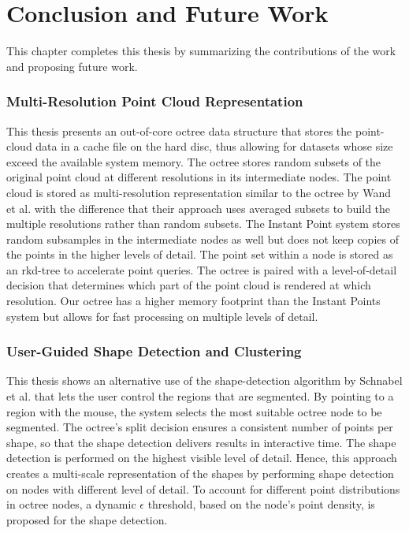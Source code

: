 \chapter{Conclusion and Future Work}
\label{chap:conclusion}


This chapter completes this thesis by summarizing the contributions of the work and proposing future work.

\subsection*{Multi-Resolution Point Cloud Representation}

This thesis presents an out-of-core octree data structure that stores the point-cloud data in a cache file on the hard disc, thus allowing for datasets whose size exceed the available system memory. The octree stores random subsets of the original point cloud at different resolutions in its intermediate nodes. The point cloud is stored as multi-resolution representation similar to the octree by Wand et al. \cite{wand2007interactive} with the difference that their approach uses averaged subsets to build the multiple resolutions rather than random subsets. The Instant Point system \cite{wimmer2006instant} stores random subsamples in the intermediate nodes as well but does not keep copies of the points in the higher levels of detail. The point set within a node is stored as an rkd-tree \cite{tobler2011rkd} to accelerate point queries. The octree is paired with a level-of-detail decision that determines which part of the point cloud is rendered at which resolution. Our octree has a higher memory footprint than the Instant Points system but allows for fast processing on multiple levels of detail. 


\subsection*{User-Guided Shape Detection and Clustering}

This thesis shows an alternative use of the shape-detection algorithm by Schnabel et al. \cite{schnabel-2007-efficient} that lets the user control the regions that are segmented. By pointing to a region with the mouse, the system selects the most suitable octree node to be segmented. The octree's split decision ensures a consistent number of points per shape, so that the shape detection delivers results in interactive time. The shape detection is performed on the highest visible level of detail. Hence, this approach creates a multi-scale representation of the shapes by performing shape detection on nodes with different level of detail. To account for different point distributions in octree nodes, a dynamic $\epsilon$ threshold, based on the node's point density, is proposed for the shape detection. 


